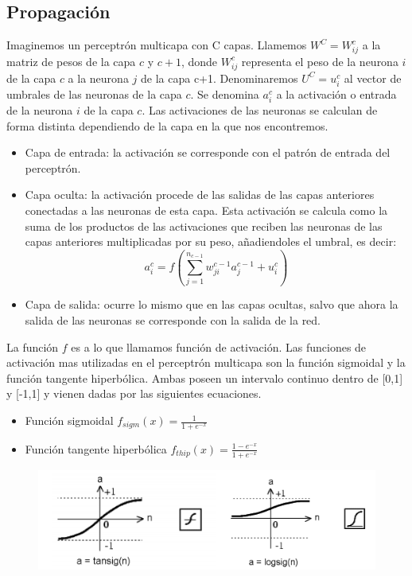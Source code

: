 \subsection{Propagación}
Imaginemos un perceptrón multicapa con C capas. Llamemos ${W^{C} = W^{c}_{ij}}$ a la matriz de pesos de la capa ${c}$ y ${c+1}$, donde ${W^{c}_{ij}}$ representa el peso de la neurona ${i}$ de la capa ${c}$ a la neurona ${j}$ de la capa c+1. Denominaremos ${U^{C} = u^{c}_{i}}$ al vector de umbrales de las neuronas de la capa ${c}$. Se denomina ${a^{c}_{i}}$ a la activación o entrada de la neurona ${i}$ de la capa ${c}$. Las activaciones de las neuronas se calculan de forma distinta dependiendo de la capa en la que nos encontremos.
\begin{itemize}
\item Capa de entrada: la activación se corresponde con el patrón de entrada del perceptrón.
\item Capa oculta: la activación procede de las salidas de las capas anteriores conectadas a las neuronas de esta capa. Esta activación se calcula como la suma de los productos de las activaciones que reciben las neuronas de las capas anteriores multiplicadas por su peso, añadiendoles el umbral, es decir:\\
\begin{equation}
a_{i}^{c} = f(\sum_{j=1}^{n_{c-1}}w_{ji}^{c-1}a_{j}^{c-1}+u_{i}^{c})
\end{equation}
\item Capa de salida: ocurre lo mismo que en las capas ocultas, salvo que ahora la salida de las neuronas se corresponde con la salida de la red.
\end{itemize}
La función ${f}$ es a lo que llamamos función de activación. Las funciones de activación mas utilizadas en el perceptrón multicapa son la función sigmoidal y la función tangente hiperbólica. Ambas poseen un intervalo continuo dentro de [0,1] y [-1,1] y vienen dadas por las siguientes ecuaciones.
\begin{itemize}
\item Función sigmoidal ${f_{sigm}(x)=\frac{1}{1+e^{-x}}}$
\item Función tangente hiperbólica ${f_{thip}(x)=\frac{1-e^{-x}}{1+e^{-x}}}$
\end{itemize}
\begin{figure}[htp]
\centering
\vspace{-1.5em}
\includegraphics[scale=0.6]{images/tansig_vs_logsig.png}
\end{figure}
